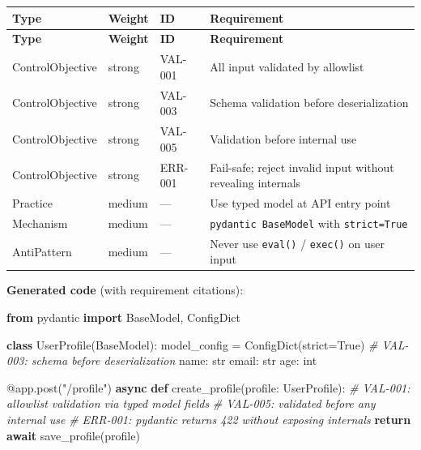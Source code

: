 \documentclass[
]{article}
\newenvironment{Shaded}{}{}
\newcommand{\AttributeTok}[1]{\textcolor[rgb]{0.49,0.56,0.16}{#1}}
\newcommand{\BuiltInTok}[1]{\textcolor[rgb]{0.00,0.50,0.00}{#1}}
\newcommand{\CommentTok}[1]{\textcolor[rgb]{0.38,0.63,0.69}{\textit{#1}}}
\newcommand{\ControlFlowTok}[1]{\textcolor[rgb]{0.00,0.44,0.13}{\textbf{#1}}}
\newcommand{\ImportTok}[1]{\textcolor[rgb]{0.00,0.50,0.00}{\textbf{#1}}}
\newcommand{\KeywordTok}[1]{\textcolor[rgb]{0.00,0.44,0.13}{\textbf{#1}}}
\newcommand{\NormalTok}[1]{#1}
\newcommand{\OperatorTok}[1]{\textcolor[rgb]{0.40,0.40,0.40}{#1}}
\newcommand{\StringTok}[1]{\textcolor[rgb]{0.25,0.44,0.63}{#1}}
\newcommand{\VariableTok}[1]{\textcolor[rgb]{0.10,0.09,0.49}{#1}}
\begin{document}
\begin{longtable}{@{}L{3.1cm}L{1.35cm}L{1.55cm}L{6.95cm}@{}}
\toprule
\textbf{Type} & \textbf{Weight} & \textbf{ID} & \textbf{Requirement} \\
\midrule
\endfirsthead
\toprule
\textbf{Type} & \textbf{Weight} & \textbf{ID} & \textbf{Requirement} \\
\midrule
\endhead
\bottomrule
\endfoot
\bottomrule
\endlastfoot
ControlObjective & strong & VAL-001 & All input validated by allowlist \\
ControlObjective & strong & VAL-003 & Schema validation before deserialization \\
ControlObjective & strong & VAL-005 & Validation before internal use \\
ControlObjective & strong & ERR-001 & Fail-safe; reject invalid input without revealing internals \\
Practice & medium & --- & Use typed model at API entry point \\
Mechanism & medium & --- & \texttt{pydantic BaseModel} with \texttt{strict=True} \\
AntiPattern & medium & --- & Never use \texttt{eval()} / \texttt{exec()} on user input \\
\end{longtable}

\textbf{Generated code} (with requirement citations):

\begin{Shaded}
\begin{Highlighting}[]
\ImportTok{from}\NormalTok{ pydantic }\ImportTok{import}\NormalTok{ BaseModel, ConfigDict}

\KeywordTok{class}\NormalTok{ UserProfile(BaseModel):}
\NormalTok{    model\_config }\OperatorTok{=}\NormalTok{ ConfigDict(strict}\OperatorTok{=}\VariableTok{True}\NormalTok{)  }\CommentTok{\# VAL{-}003: schema before deserialization}
\NormalTok{    name: }\BuiltInTok{str}
\NormalTok{    email: }\BuiltInTok{str}
\NormalTok{    age: }\BuiltInTok{int}

\AttributeTok{@app.post}\NormalTok{(}\StringTok{"/profile"}\NormalTok{)}
\ControlFlowTok{async} \KeywordTok{def}\NormalTok{ create\_profile(profile: UserProfile):}
    \CommentTok{\# VAL{-}001: allowlist validation via typed model fields}
    \CommentTok{\# VAL{-}005: validated before any internal use}
    \CommentTok{\# ERR{-}001: pydantic returns 422 without exposing internals}
    \ControlFlowTok{return} \ControlFlowTok{await}\NormalTok{ save\_profile(profile)}
\end{Highlighting}
\end{Shaded}
\end{document}
